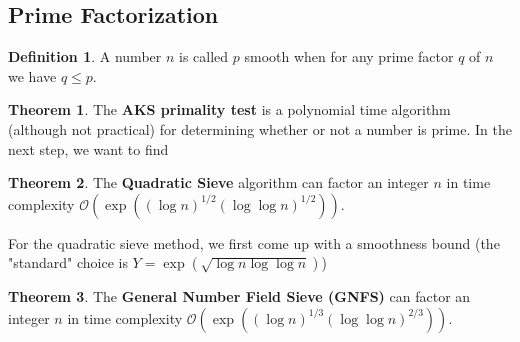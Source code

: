 \documentclass[11pt]{article}
\theoremstyle{definition}
\newtheorem{defn}{Definition}
\newtheorem{thm}{Theorem}
\begin{document}
    \subsection{Prime Factorization}
    \begin{defn}
        A number \(n\) is called \(p\) smooth when for any prime factor \(q\) of \(n\) we have \(q \leq p\).
    \end{defn}
    \begin{thm}
        The \textbf{AKS primality test} is a polynomial time algorithm (although not practical) for determining whether or not a number is prime. In the next step, we want to find 
    \end{thm}
    \begin{thm}
        The \textbf{Quadratic Sieve} algorithm can factor an integer \(n\) in time complexity \newline \(\mathcal{O}(\exp((\log n)^{1/2}(\log\log n)^{1/2}))\).
    \end{thm}
    For the quadratic sieve method, we first come up with a smoothness bound (the "standard" choice is \(Y = \exp(\sqrt{\log n \log\log n})\))
    \begin{thm}
        The \textbf{General Number Field Sieve (GNFS)} can factor an integer \(n\) in time complexity \(\mathcal{O}(\exp((\log n)^{1/3}(\log\log n)^{2/3}))\).
    \end{thm}
\end{document}
